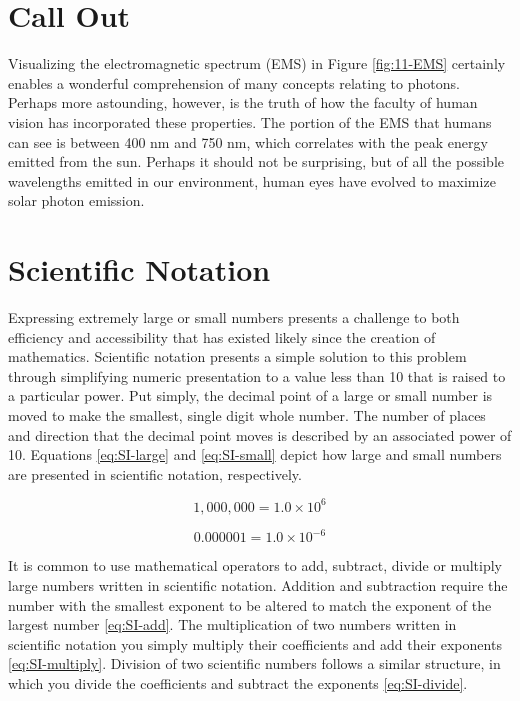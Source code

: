 \documentclass[
]{book}
\begin{document}
\hypertarget{call-out-1}{%
\section*{Call Out}\label{call-out-1}}

Visualizing the electromagnetic spectrum (EMS) in Figure \ref{fig:11-EMS} certainly
enables a wonderful comprehension of many concepts relating to photons.
Perhaps more astounding, however, is the truth of how the faculty of
human vision has incorporated these properties. The portion of the EMS
that humans can see is between 400 nm and 750 nm, which correlates with
the peak energy emitted from the sun. Perhaps it should not be
surprising, but of all the possible wavelengths emitted in our
environment, human eyes have evolved to maximize solar photon emission.

\hypertarget{scientific-notation}{%
\section{Scientific Notation}\label{scientific-notation}}

Expressing extremely large or small numbers presents a challenge to both
efficiency and accessibility that has existed likely since the creation
of mathematics. Scientific notation presents a simple solution to this
problem through simplifying numeric presentation to a value less than 10
that is raised to a particular power. Put simply, the decimal point of a
large or small number is moved to make the smallest, single digit whole
number. The number of places and direction that the decimal point moves
is described by an associated power of 10. Equations \eqref{eq:SI-large}
and \eqref{eq:SI-small} depict how large and small numbers are presented
in scientific notation, respectively.

\begin{equation}
1,000,000 = 1.0 × 10^{6} 
\label{eq:SI-large}
\end{equation}

\begin{equation}
0.000001 = 1.0 × 10 ^{-6} 
\label{eq:SI-small}
\end{equation}

It is common to use mathematical operators to add, subtract, divide or
multiply large numbers written in scientific notation. Addition and
subtraction require the number with the smallest exponent to be altered
to match the exponent of the largest number \eqref{eq:SI-add}. The
multiplication of two numbers written in scientific notation you simply
multiply their coefficients and add their exponents
\eqref{eq:SI-multiply}. Division of two scientific numbers follows a
similar structure, in which you divide the coefficients and subtract the
exponents \eqref{eq:SI-divide}.
\end{document}
